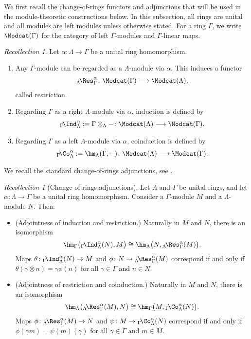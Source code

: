 \documentclass{amsart}
\numberwithin{equation}{section}%
\theoremstyle{remark}
\newtheorem{Rec}[equation]{Recollection}
\theoremstyle{definition}
\newcommand{\lInd}[1]{{}_{#1}\!\Ind}
\newcommand{\lRes}[1]{{}_{#1}\!\Res}
\newcommand{\lCo}[1]{{}_{#1}\!\Co}
\begin{document}
We first recall the change-of-rings functors and adjunctions
that will be used in the module-theoretic constructions below.
In this subsection, all rings are unital and all modules are
left modules unless otherwise stated. For a ring $\Gamma$,
we write $\Modcat(\Gamma)$ for the category of left
$\Gamma$-modules and $\Gamma$-linear maps.
%
\begin{Rec}
\label{Rec:change-of-rings}
Let $\alpha\colon\Lambda\to\Gamma$ be a unital ring homomorphism.
\begin{enumerate}
\item Any $\Gamma$-module can be regarded as a $\Lambda$-module via
$\alpha$. This induces a functor
%
\[
\lRes{\Lambda}_{\Gamma}^{\alpha}
\colon
\Modcat(\Gamma)\longrightarrow\Modcat(\Lambda),
\]
%
called restriction.

\item Regarding $\Gamma$ as a right $\Lambda$-module via $\alpha$,
induction is defined by
%
\[
\lInd{\Gamma}_{\Lambda}^{\alpha}
:=
\Gamma\otimes_{\Lambda}-
\colon
\Modcat(\Lambda)\longrightarrow\Modcat(\Gamma).
\]
%
\item Regarding $\Gamma$ as a left $\Lambda$-module via $\alpha$,
coinduction is defined by
%
\[
\lCo{\Gamma}_{\Lambda}^{\alpha}
:=
\hm_{\Lambda}(\Gamma,-)
\colon
\Modcat(\Lambda)\longrightarrow\Modcat(\Gamma).
\]
%
\end{enumerate}
\end{Rec}
%
We recall the standard change-of-rings adjunctions, see
\cite[Section 2.8]{Benson91}.
%
\begin{Rec}[Change-of-rings adjunctions]
\label{Rec:change-of-rings-adjunctions}
Let $\Lambda$ and $\Gamma$ be unital rings, and let
$\alpha\colon\Lambda\to\Gamma$ be a unital ring homomorphism.
Consider a $\Gamma$-module $M$ and a $\Lambda$-module $N$.
Then:
%
\begin{itemize}

\item[(a)] (Adjointness of induction and restriction.)
Naturally in $M$ and $N$, there is an isomorphism
%
\[
\hm_{\Gamma}
\bigl(
\lInd{\Gamma}_{\Lambda}^{\alpha}(N),M
\bigr)
\cong
\hm_{\Lambda}
\bigl(
N,\lRes{\Lambda}_{\Gamma}^{\alpha}(M)
\bigr).
\]
%
Maps
$\theta\colon
\lInd{\Gamma}_{\Lambda}^{\alpha}(N)\to M$
and
$\phi\colon
N\to\lRes{\Lambda}_{\Gamma}^{\alpha}(M)$
correspond if and only if~$\theta(\gamma\otimes n)=\gamma\phi(n)$
for all $\gamma\in\Gamma$ and $n\in N$.

\item[(b)] (Adjointness of restriction and coinduction.)
Naturally in $M$ and $N$, there is an isomorphism
%
\[
\hm_{\Lambda}
\bigl(
\lRes{\Lambda}_{\Gamma}^{\alpha}(M),N
\bigr)
\cong
\hm_{\Gamma}
\bigl(
M,\lCo{\Gamma}_{\Lambda}^{\alpha}(N)
\bigr).
\]
%
Maps
$\phi\colon
\lRes{\Lambda}_{\Gamma}^{\alpha}(M)\to N$
and
$\psi\colon
M\to\lCo{\Gamma}_{\Lambda}^{\alpha}(N)$
correspond if and only if
$\phi(\gamma m)=\psi(m)(\gamma)$
for all $\gamma\in\Gamma$ and $m\in M$.

\end{itemize}
\end{Rec}
\end{document}
